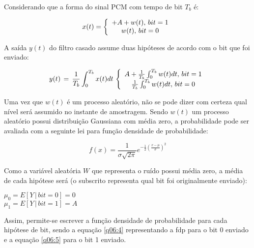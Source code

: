 Considerando que a forma do sinal PCM com tempo de bit $T_b$ é:

\begin{equation} \label{q06:1}
    \centering
    x(t) = 
    \left \{
    \begin{array}{cc}
    +A+w(t), \, bit=1  \\
    w(t), \, bit=0  \\
    \end{array}
    \right.
\end{equation}

A saída $y(t)$ do filtro casado assume duas hipóteses de acordo com o bit que foi enviado:

\begin{equation} \label{q06:2}
    \centering
    y(t) \, = \, \frac{1}{T_b}\int_{0}^{T_b} x(t) dt \,
    \left \{
    \begin{array}{cc}
    A+\frac{1}{T_b}\int_{0}^{T_b} w(t) dt, \, bit=1  \\
    \frac{1}{T_b}\int_{0}^{T_b} w(t) dt, \, bit=0  \\
    \end{array}
    \right.
\end{equation}

Uma vez que $w(t)$ é um processo aleatório, não se pode dizer com certeza qual nível será assumido no instante de amostragem. Sendo $w(t)$ um processo aleatório possui distribuição Gaussiana com média zero, a probabilidade pode ser avaliada com a seguinte lei para função densidade de probabilidade:

\begin{equation} \label{q06:3}
    f(x) = \frac{1}{\sigma\sqrt{2\pi}} e^{-\frac{1}{2} \left(\frac{x-\mu}{\sigma}\right)^2}
\end{equation}

Como a variável aleatória $W$ que representa o ruído possui média zero, a média de cada hipótese será (o subscrito representa qual bit foi originalmente enviado):

\begin{center}
    $\mu_0 = E[Y \, | \, bit = 0] = 0$ \\ \vspace{1pt}
    $\mu_1 = E[Y \, | \, bit = 1] = A$
\end{center}

Assim, permite-se escrever a função densidade de probabilidade para cada hipótese de bit, sendo a equação \ref{q06:4} representando a fdp para o bit 0 enviado e a equação \ref{q06:5} para o bit 1 enviado.

